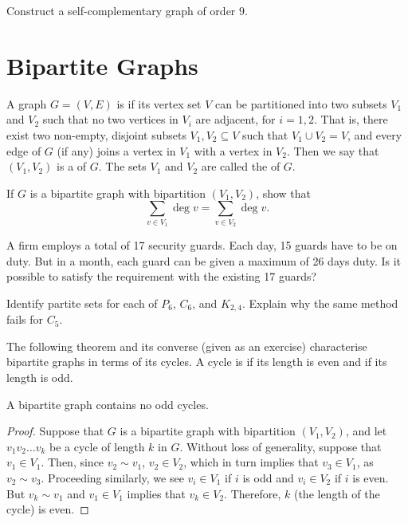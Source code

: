 \begin{Exercise}
Construct a self-complementary graph of order $9$.
\end{Exercise}

\section{Bipartite Graphs}\label{sec:Bipartite}

A graph $G = (V, E)$ is  if its vertex set $V$ can be partitioned into two subsets $V_1$ and $V_2$ such that no two vertices in $V_i$ are adjacent, for $i = 1, 2$. That is, there exist two non-empty, disjoint subsets $V_1, V_2 \subseteq V$ such that $V_1 \cup V_2 = V$, and every edge of $G$ (if any) joins a vertex in $V_1$ with a vertex in $V_2$. Then we say that $(V_1, V_2)$ is a  of $G$. The sets $V_1$ and $V_2$ are called the  of $G$.

\begin{Exercise}
If $G$ is a bipartite graph with bipartition $(V_1, V_2)$, show that
\begin{equation*}
\sum_{v \in V_1} \deg v = \sum_{v \in V_2} \deg v.
\end{equation*}
\end{Exercise}

\begin{Exercise}
A firm employs a total of 17 security guards. Each day, 15 guards have to be on duty. But in a month, each guard can be given a maximum of 26 days duty. Is it possible to satisfy the requirement with the existing 17 guards?
\end{Exercise}

\begin{Exercise}
Identify partite sets for each of $P_6$, $C_6$, and $K_{2,4}$. Explain why the same method fails for $C_5$.
\end{Exercise}

The following theorem and its converse (given as an exercise) characterise bipartite graphs in terms of its cycles. A cycle is  if its length is even and  if its length is odd.

\begin{Theorem}
A bipartite  graph contains no odd cycles.
\end{Theorem}

\begin{proof}
Suppose that $G$ is a bipartite graph with bipartition $(V_1, V_2)$, and let $v_1 v_2 \ldots v_k$ be a cycle of length $k$ in $G$. Without loss of generality, suppose that $v_1 \in V_1$. Then, since $v_2 \sim v_1$, $v_2 \in V_2$, which in turn implies that $v_3 \in V_1$, as $v_2 \sim v_3$. Proceeding similarly, we see $v_i \in V_1$ if $i$ is odd and $v_i \in V_2$ if $i$ is even. But $v_k \sim v_1$ and $v_1 \in V_1$ implies that $v_k \in V_2$. Therefore, $k$ (the length of the cycle) is even.
\end{proof}

